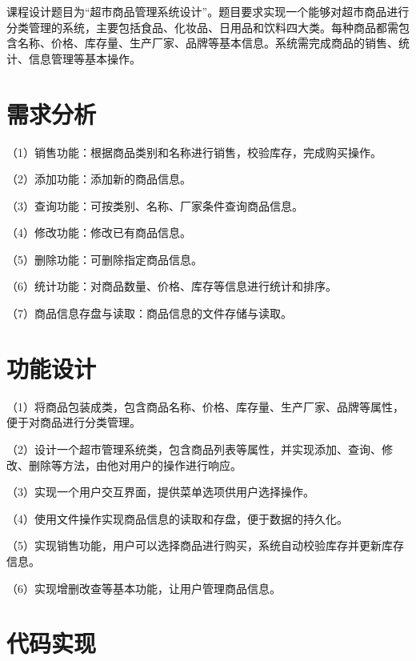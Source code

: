 \documentclass[12pt, a4paper, oneside]{ctexart}
\begin{document}
\begin{flushleft}
课程设计题目为“超市商品管理系统设计”。题目要求实现一个能够对超市商品进行分类管理的系统，主要包括食品、化妆品、日用品和饮料四大类。每种商品都需包含名称、价格、库存量、生产厂家、品牌等基本信息。系统需完成商品的销售、统计、信息管理等基本操作。
\end{flushleft}

\section{需求分析}

\begin{flushleft}
（1）销售功能：根据商品类别和名称进行销售，校验库存，完成购买操作。

（2）添加功能：添加新的商品信息。

（3）查询功能：可按类别、名称、厂家条件查询商品信息。

（4）修改功能：修改已有商品信息。

（5）删除功能：可删除指定商品信息。

（6）统计功能：对商品数量、价格、库存等信息进行统计和排序。

（7）商品信息存盘与读取：商品信息的文件存储与读取。
\end{flushleft}

\section{功能设计}

\begin{flushleft}
（1）将商品包装成类，包含商品名称、价格、库存量、生产厂家、品牌等属性，便于对商品进行分类管理。

（2）设计一个超市管理系统类，包含商品列表等属性，并实现添加、查询、修改、删除等方法，由他对用户的操作进行响应。

（3）实现一个用户交互界面，提供菜单选项供用户选择操作。

（4）使用文件操作实现商品信息的读取和存盘，便于数据的持久化。

（5）实现销售功能，用户可以选择商品进行购买，系统自动校验库存并更新库存信息。

（6）实现增删改查等基本功能，让用户管理商品信息。
\end{flushleft}

\section{代码实现}
\end{document}
